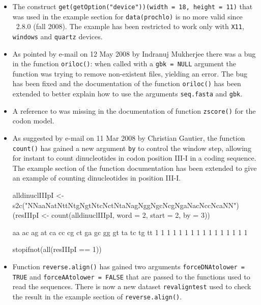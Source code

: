 \documentclass{article}
\begin{document}
\begin{itemize}

\item The construct \texttt{get(getOption("device"))(width = 18, height = 11)}
  that was used in the example section for \texttt{data(prochlo)} is no
  more valid since \Rlogo{}~2.8.0 (fall 2008). The example has been
  restricted to work only with \texttt{X11}, \texttt{windows} and
  \texttt{quartz} devices.

\item As pointed by e-mail on 12 May 2008 by Indranuj Mukherjee there
  was a bug in the function \texttt{oriloc()}: when called with a
  \texttt{gbk = NULL} argument the function was trying to remove
  non-existent files, yielding an error. The bug has been fixed and
  the documentation of the function \texttt{oriloc()} has been
  extended to better explain how to use the arguments \texttt{seq.fasta}
  and \texttt{gbk}.

\item A reference to \cite{GautierC1985} was missing in the documentation
  of function \texttt{zscore()} for the codon model.

\item As suggested by e-mail on 11 Mar 2008 by Christian Gautier,
  the function \texttt{count()}
  has gained a new argument \texttt{by} to control the window step,
  allowing for instant to count dinucleotides in codon position III-I
  in a coding sequence. The example section of the function documentation
  has been extended to give an example of counting dinucleotides in
  position III-I.

\begin{Schunk}
\begin{Sinput}
 alldinuclIIIpI <- s2c("NNaaNatNttNtgNgtNtcNctNtaNagNggNgcNcgNgaNacNccNcaNN")
 (resIIIpI <- count(alldinuclIIIpI, word = 2, start = 2, by = 3))
\end{Sinput}
\begin{Soutput}
aa ac ag at ca cc cg ct ga gc gg gt ta tc tg tt 
 1  1  1  1  1  1  1  1  1  1  1  1  1  1  1  1 
\end{Soutput}
\begin{Sinput}
 stopifnot(all(resIIIpI == 1))
\end{Sinput}
\end{Schunk}

\item Function \texttt{reverse.align()} has gained two arguments
  \texttt{forceDNAtolower = TRUE} and \texttt{forceAAtolower = FALSE} 
  that are passed to the functions used to read the sequences.
  There is now a new dataset \texttt{revaligntest} used to check
  the result in the example section of \texttt{reverse.align()}.


\end{itemize}
\end{document}
